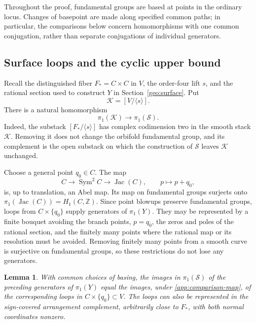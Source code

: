 \documentclass[11pt,reqno]{amsart}
\numberwithin{equation}{section}
\newtheorem{lemma}[theorem]{Lemma}
\theoremstyle{definition}
\theoremstyle{remark}
\begin{document}
Throughout the proof, fundamental groups are based at points in the
ordinary locus.  Changes of basepoint are made along specified common
paths; in particular, the comparisons below concern homomorphisms with
one common conjugation, rather than separate conjugations of individual
generators.

\subsection{Surface loops and the cyclic upper bound}

Recall the distinguished fiber $F_*=C\times C$ in $V$, the order-four
lift $s$, and the rational section used to construct $Y$ in
Section~\ref{geo:surface}.  Put
\[
 \mathcal K=[V/\langle s\rangle].
\]
There is a natural homomorphism
\begin{equation}\label{app:comparison-map}
 \pi_1(\mathcal K)\longrightarrow\pi_1(\mathcal S).
\end{equation}
Indeed, the substack $[F_*/\langle s\rangle]$ has complex codimension
two in the smooth stack $\mathcal K$.  Removing it does not change the
orbifold fundamental group, and its complement is the open substack on
which the construction of $\mathcal S$ leaves $\mathcal K$ unchanged.

Choose a general point $q_0\in C$.  The map
\[
 C\longrightarrow\operatorname{Sym}^2 C\longrightarrow\operatorname{Jac}(C),
 \qquad p\longmapsto p+q_0,
\]
is, up to translation, an Abel map.  Its map on fundamental groups
surjects onto $\pi_1(\operatorname{Jac}(C))=H_1(C,\mathbb Z)$.  Since point blowups preserve
fundamental groups, loops from $C\times\{q_0\}$ supply generators of
$\pi_1(Y)$.  They may be represented by a finite bouquet avoiding the
branch points, $p=q_0$, the zeros and poles of the rational section,
and the finitely many points where the rational map or its resolution
must be avoided.  Removing finitely many points from a smooth curve is
surjective on fundamental groups, so these restrictions do not lose any
generators.

\begin{lemma}\label{app:surface-comparison}
With common choices of basing, the images in $\pi_1(\mathcal S)$ of the
preceding generators of $\pi_1(Y)$ equal the images, under
\eqref{app:comparison-map}, of the corresponding loops in
$C\times\{q_0\}\subset V$.  The loops can also be represented in the
sign-covered arrangement complement, arbitrarily close to $F_*$, with
both normal coordinates nonzero.
\end{lemma}
\end{document}
